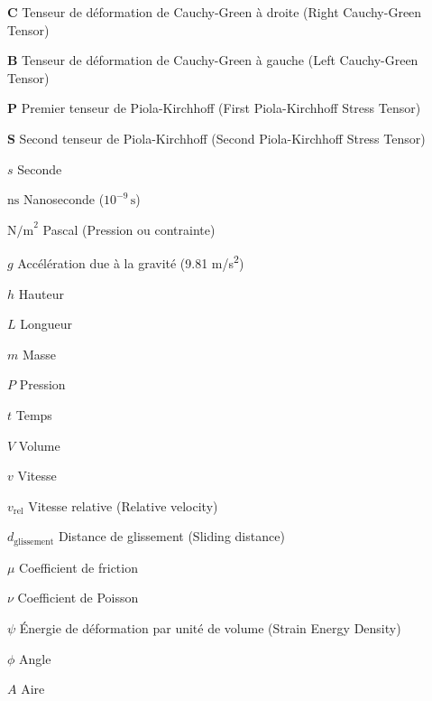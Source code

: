 \begin{listofsymbols}[3cm]
    \item [$\boldsymbol{C}$] Tenseur de déformation de Cauchy-Green à droite (Right Cauchy-Green Tensor)
    \item [$\boldsymbol{B}$] Tenseur de déformation de Cauchy-Green à gauche (Left Cauchy-Green Tensor)

    \item [$\boldsymbol{P}$] Premier tenseur de Piola-Kirchhoff (First Piola-Kirchhoff Stress Tensor)
    \item [$\boldsymbol{S}$] Second tenseur de Piola-Kirchhoff (Second Piola-Kirchhoff Stress Tensor)

    \item [$s$] Seconde
    \item [$\text{ns}$] Nanoseconde (\(10^{-9} \, \text{s}\))
    \item [$\text{N/m}^2$] Pascal (Pression ou contrainte)

    \item [$g$] Accélération due à la gravité (9.81 m/s\textsuperscript{2})
    \item [$h$] Hauteur
    \item [$L$] Longueur
    \item [$m$] Masse
    \item [$P$] Pression
    \item [$t$] Temps
    \item [$V$] Volume
    \item [$v$] Vitesse
    \item [$v_{\text{rel}}$] Vitesse relative (Relative velocity)
    \item [$d_{\text{glissement}}$] Distance de glissement (Sliding distance)
    \item [$\mu$] Coefficient de friction
    \item [$\nu$] Coefficient de Poisson
    \item [$\psi$] Énergie de déformation par unité de volume (Strain Energy Density)
    \item [$\phi$] Angle
    \item [$A$] Aire
\end{listofsymbols}
